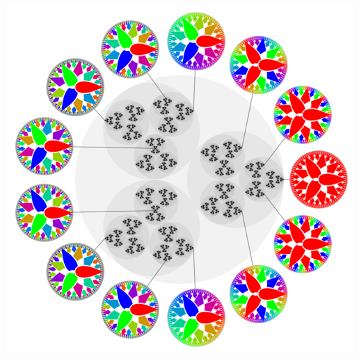 \documentclass[entwurf]{uebblatt}
\begin{document}
{\centering\href{https://en.wikipedia.org/wiki/P-adic_number}{\includegraphics[scale=0.24]{images/p-adic-numbers}}\par}
\end{document}
